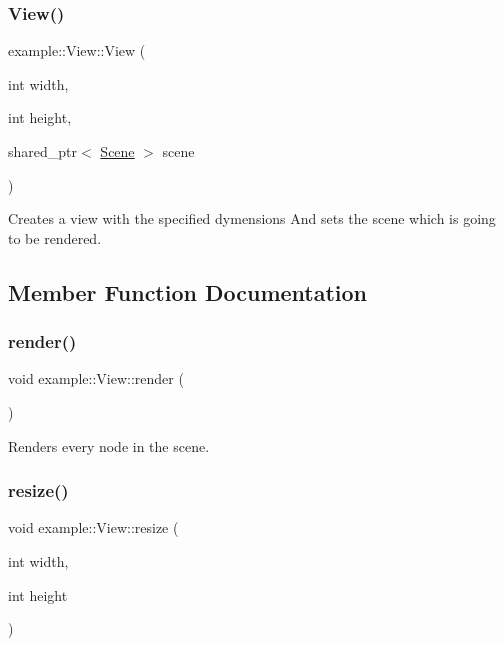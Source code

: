 \subsubsection{\texorpdfstring{View()}{View()}}
{\footnotesize\ttfamily example\+::\+View\+::\+View (\begin{DoxyParamCaption}\item[{int}]{width,  }\item[{int}]{height,  }\item[{shared\+\_\+ptr$<$ \mbox{\hyperlink{classexample_1_1_scene}{Scene}} $>$}]{scene }\end{DoxyParamCaption})}



Creates a view with the specified dymensions And sets the scene which is going to be rendered. 



\subsection{Member Function Documentation}
\mbox{\label{classexample_1_1_view_a10ea89fc705a2ba2252f673499524bf2}} 
\subsubsection{\texorpdfstring{render()}{render()}}
{\footnotesize\ttfamily void example\+::\+View\+::render (\begin{DoxyParamCaption}{ }\end{DoxyParamCaption})}



Renders every node in the scene. 

\mbox{\label{classexample_1_1_view_a2396337a1db393acefb174e386cde7d1}} 
\subsubsection{\texorpdfstring{resize()}{resize()}}
{\footnotesize\ttfamily void example\+::\+View\+::resize (\begin{DoxyParamCaption}\item[{int}]{width,  }\item[{int}]{height }\end{DoxyParamCaption})}



